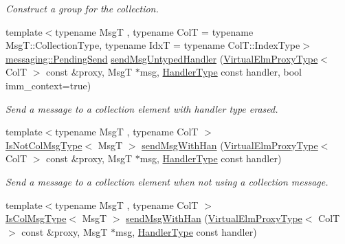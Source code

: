 \begin{DoxyCompactItemize}
\begin{DoxyCompactList}\small\item\em Construct a group for the collection. \end{DoxyCompactList}\item 
{\footnotesize template$<$typename MsgT , typename ColT  = typename Msg\+T\+::\+Collection\+Type, typename IdxT  = typename Col\+T\+::\+Index\+Type$>$ }\\\hyperlink{structvt_1_1messaging_1_1_pending_send}{messaging\+::\+Pending\+Send} \hyperlink{structvt_1_1vrt_1_1collection_1_1_collection_manager_a6411b315ab0a4bfa0293db456077d5cc}{send\+Msg\+Untyped\+Handler} (\hyperlink{namespacevt_1_1vrt_a620a5c8c59d13e513f690c74b4af516f}{Virtual\+Elm\+Proxy\+Type}$<$ ColT $>$ const \&proxy, MsgT $\ast$msg, \hyperlink{namespacevt_af64846b57dfcaf104da3ef6967917573}{Handler\+Type} const handler, bool imm\+\_\+context=true)
\begin{DoxyCompactList}\small\item\em Send a message to a collection element with handler type erased. \end{DoxyCompactList}\item 
{\footnotesize template$<$typename MsgT , typename ColT $>$ }\\\hyperlink{structvt_1_1vrt_1_1collection_1_1_collection_manager_ae376deeefd4f89a0b1c93849977715d9}{Is\+Not\+Col\+Msg\+Type}$<$ MsgT $>$ \hyperlink{structvt_1_1vrt_1_1collection_1_1_collection_manager_ae3ae6f30c8b4aa2c8b50494127cbd77b}{send\+Msg\+With\+Han} (\hyperlink{namespacevt_1_1vrt_a620a5c8c59d13e513f690c74b4af516f}{Virtual\+Elm\+Proxy\+Type}$<$ ColT $>$ const \&proxy, MsgT $\ast$msg, \hyperlink{namespacevt_af64846b57dfcaf104da3ef6967917573}{Handler\+Type} const handler)
\begin{DoxyCompactList}\small\item\em Send a message to a collection element when not using a collection message. \end{DoxyCompactList}\item 
{\footnotesize template$<$typename MsgT , typename ColT $>$ }\\\hyperlink{structvt_1_1vrt_1_1collection_1_1_collection_manager_a21c21612c806016788057aeab142af20}{Is\+Col\+Msg\+Type}$<$ MsgT $>$ \hyperlink{structvt_1_1vrt_1_1collection_1_1_collection_manager_a6b95df3e94665b5ec8a2c1a186f4ca30}{send\+Msg\+With\+Han} (\hyperlink{namespacevt_1_1vrt_a620a5c8c59d13e513f690c74b4af516f}{Virtual\+Elm\+Proxy\+Type}$<$ ColT $>$ const \&proxy, MsgT $\ast$msg, \hyperlink{namespacevt_af64846b57dfcaf104da3ef6967917573}{Handler\+Type} const handler)

\end{DoxyCompactItemize}
